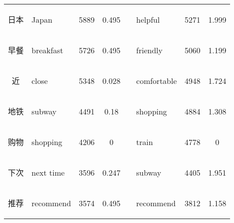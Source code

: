 \documentclass[smallextended,natbib]{svjour3}       %
\begin{document}
\begin{table}[h]
{\begin{tabular}{|c|l|c|c|l|l|c|c|}
\begin{CJK}{UTF8}{gbsn} 日本 \end{CJK}            & Japan                                     & 5889               & 0.495               &                                & helpful                            & 5271               & 1.999               \\ \cline{1-4} \cline{6-8} 
\begin{CJK}{UTF8}{gbsn} 早餐 \end{CJK}            & breakfast                                 & 5726               & 0.495               &                                & friendly                           & 5060               & 1.199               \\ \cline{1-4} \cline{6-8} 
\begin{CJK}{UTF8}{gbsn} 近 \end{CJK}             & close                                     & 5348               & 0.028               &                                & comfortable                        & 4948               & 1.724               \\ \cline{1-4} \cline{6-8} 
\begin{CJK}{UTF8}{gbsn} 地铁 \end{CJK}            & subway                                    & 4491               & 0.18                &                                & shopping                           & 4884               & 1.308               \\ \cline{1-4} \cline{6-8} 
\begin{CJK}{UTF8}{gbsn} 购物 \end{CJK}            & shopping                                  & 4206               & 0                   &                                & train                              & 4778               & 0                   \\ \cline{1-4} \cline{6-8} 
\begin{CJK}{UTF8}{gbsn} 下次 \end{CJK}            & next time                                 & 3596               & 0.247               &                                & subway                             & 4405               & 1.951               \\ \cline{1-4} \cline{6-8} 
\begin{CJK}{UTF8}{gbsn} 推荐 \end{CJK}            & recommend                                 & 3574               & 0.495               &                                & recommend                          & 3812               & 1.158               \\ \cline{1-4} \cline{6-8} 
\end{tabular}%
}
\end{table}
\end{document}
